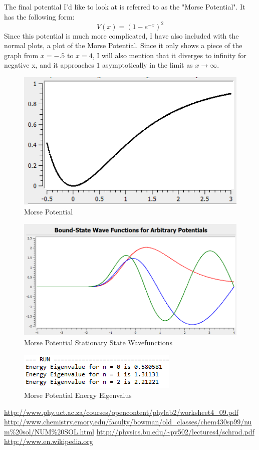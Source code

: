 \documentclass[11pt]{article} %
\begin{document}
\par The final potential I'd like to look at is referred to as the "Morse Potential". It has the following form:
\begin{equation}
V(x) = (1 - e^{-x})^2
\end{equation}
Since this potential is much more complicated, I have also included with the normal plots, a plot of the Morse Potential. Since it only shows a piece of the graph from $x=-.5$ to $x =4$, I will also mention that it diverges to infinity for negative x, and it approaches $1$ asymptotically in the limit as $x \to \infty$. 
\begin{figure}
\centering
\includegraphics{fp9}
\caption{Morse Potential}
\end{figure}
\begin{figure}
\centering
\includegraphics[scale = .5]{fp10}
\caption{Morse Potential Stationary State Wavefunctions}
\end{figure}
\begin{figure}
\centering
\includegraphics{fp11}
\caption{Morse Potential Energy Eigenvalus}
\end{figure}
\begin{thebibliography}{9}

\url{http://www.phy.uct.ac.za/courses/opencontent/phylab2/worksheet4_09.pdf}
\url{http://www.chemistry.emory.edu/faculty/bowman/old_classes/chem430sp99/num%20sol/NUM%20SOL.html}
\url{http://physics.bu.edu/~py502/lectures4/schrod.pdf}
\url{http://www.en.wikipedia.org}
\end{thebibliography}
\end{document}
